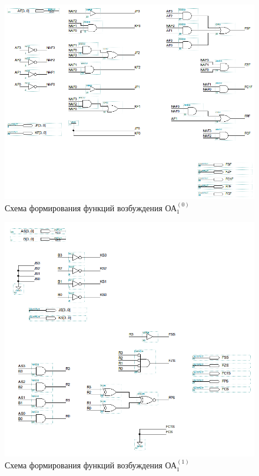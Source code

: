 \begin{figure}[H]
	\includegraphics[scale=0.6]{images/altera/rev2/oa10_logic.png}
	\caption{Схема формирования функций возбуждения ОА$^{(0)}_{1}$}
	\label{figure:oa10log}
\end{figure}

\begin{figure}[H]
	\includegraphics[scale=0.6]{images/altera/rev2/oa11_logic.png}
	\caption{Схема формирования функций возбуждения ОА$^{(1)}_{1}$}
	\label{figure:oa11log}
\end{figure}


